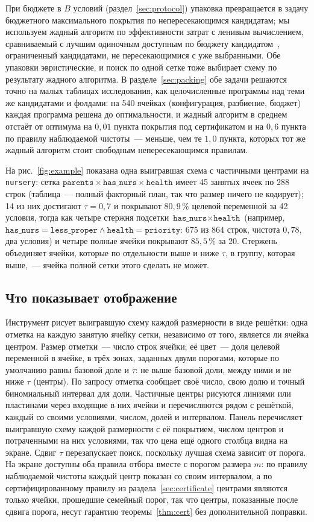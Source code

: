 \documentclass[11pt]{article}
\begin{document}
При бюджете в $B$ условий (раздел~\ref{sec:protocol}) упаковка превращается в задачу бюджетного максимального покрытия по непересекающимся кандидатам; мы используем жадный алгоритм по эффективности затрат с ленивым вычислением, сравниваемый с лучшим одиночным доступным по бюджету кандидатом~\citep{khuller1999}, ограниченный кандидатами, не пересекающимися с уже выбранными. Обе упаковки эвристические, и поиск по одной сетке тоже выбирает схему по результату жадного алгоритма. В разделе~\ref{sec:packing} обе задачи решаются точно на малых таблицах исследования, как целочисленные программы над теми же кандидатами и фолдами: на 540 ячейках (конфигурация, разбиение, бюджет) каждая программа решена до оптимальности, и жадный алгоритм в среднем отстаёт от оптимума на $0{,}01$ пункта покрытия под сертификатом и на $0{,}6$ пункта по правилу наблюдаемой чистоты~--- меньше, чем те $1{,}0$ пункта, которых тот же жадный алгоритм стоит свободным непересекающимся правилам.

На рис.~\ref{fig:example} показана одна выигравшая схема с частичными центрами на \texttt{nursery}: сетка $\texttt{parents}\times\texttt{has\_nurs}\times\texttt{health}$ имеет 45 занятых ячеек по 288 строк (таблица~--- полный факторный план, так что размер ничего не кодирует); 14 из них достигают $\tau=0{,}7$ и покрывают $80{,}9\,\%$ целевой переменной за 42 условия, тогда как четыре стержня подсетки $\texttt{has\_nurs}\times\texttt{health}$ (например, $\texttt{has\_nurs}=\texttt{less\_proper}\wedge\texttt{health}=\texttt{priority}$: $675$ из $864$ строк, чистота $0{,}78$, два условия) и четыре полные ячейки покрывают $85{,}5\,\%$ за 20. Стержень объединяет ячейки, которые по отдельности выше и ниже $\tau$, в группу, которая выше,~--- ячейка полной сетки этого сделать не может.

\subsection{Что показывает отображение}\label{sec:display}
Инструмент рисует выигравшую схему каждой размерности в виде решётки: одна отметка на каждую занятую ячейку сетки, независимо от того, является ли ячейка центром. Размер отметки~--- число строк ячейки; её цвет~--- доля целевой переменной в ячейке, в трёх зонах, заданных двумя порогами, которые по умолчанию равны базовой доле и $\tau$: не выше базовой доли, между ними и не ниже $\tau$ (центры). По запросу отметка сообщает своё число, свою долю и точный биномиальный интервал для доли. Частичные центры рисуются линиями или пластинами через входящие в них ячейки и перечисляются рядом с решёткой, каждый со своими условиями, числом, долей и интервалом. Панель перечисляет выигравшую схему каждой размерности с её покрытием, числом центров и потраченными на них условиями, так что цена ещё одного столбца видна на экране. Сдвиг $\tau$ перезапускает поиск, поскольку лучшая схема зависит от порога. На экране доступны оба правила отбора вместе с порогом размера $m$: по правилу наблюдаемой чистоты каждый центр показан со своим интервалом, а по сертифицированному правилу из раздела~\ref{sec:certificate} центрами являются только ячейки, прошедшие семейный порог, так что центры, показанные после сдвига порога, несут гарантию теоремы~\ref{thm:cert} без дополнительной поправки.
\end{document}
